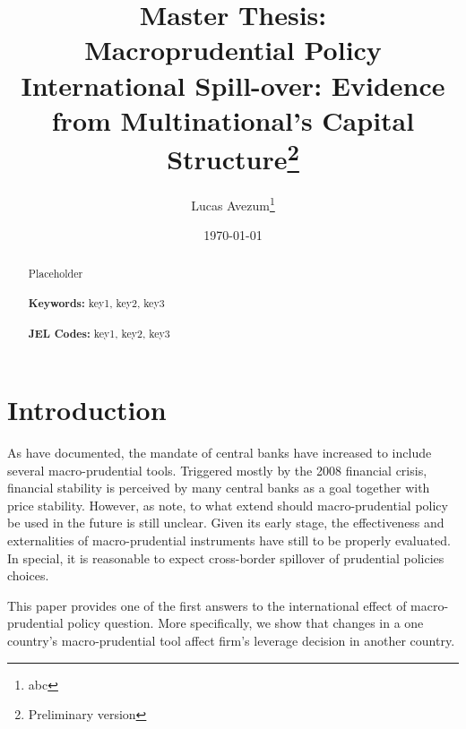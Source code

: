 \documentclass[12pt]{article}
\begin{document}
	
	\begin{titlepage}
		\title{Master Thesis: \\ Macroprudential Policy International Spill-over: Evidence from Multinational's Capital Structure\thanks{Preliminary version}}
		\author{Lucas Avezum\thanks{abc}}
		\date{\today}
		\maketitle
		\begin{abstract}
			\noindent Placeholder\\
			\vspace{0in}\\
			\noindent\textbf{Keywords:} key1, key2, key3\\
			\vspace{0in}\\
			\noindent\textbf{JEL Codes:} key1, key2, key3\\
			
			\bigskip
		\end{abstract}
		\setcounter{page}{0}
		\thispagestyle{empty}
	\end{titlepage}
	\pagebreak \newpage
	
	
	
	
	\doublespacing
	
	
	\section{Introduction} \label{sec:introduction}
	As \cite*{blinder2016necessity} have documented, the mandate of central banks have increased to include several macro-prudential tools. Triggered mostly by the 2008 financial crisis, financial stability is perceived by many central banks as a goal together with price stability. However, as \cite{blinder2016necessity} note, to what extend should macro-prudential policy be used in the future is still unclear. Given its early stage, the effectiveness and externalities of macro-prudential instruments have still to be properly evaluated. In special, it is reasonable to expect cross-border spillover of prudential policies choices. 
	
	This paper provides one of the first answers to the international effect of macro-prudential policy question. More specifically, we show that changes in a one country's macro-prudential tool affect firm's leverage decision in another country. 
	
\end{document}
